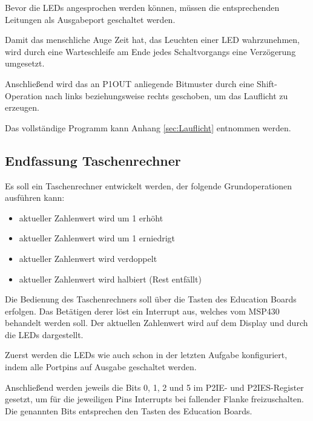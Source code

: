 \documentclass[12pt,a4paper,bibliography=totocnumbered,listof=totocnumbered]{scrartcl}
\begin{document}
Bevor die LEDs angesprochen werden können, müssen die entsprechenden Leitungen als Ausgabeport geschaltet werden.

\vspace{1em}


Damit das menschliche Auge Zeit hat, das Leuchten einer LED wahrzunehmen, wird durch eine Warteschleife am Ende jedes Schaltvorgangs eine Verzögerung umgesetzt.

\vspace{1em}


Anschließend wird das an P1OUT anliegende Bitmuster durch eine Shift-Operation nach links beziehungsweise rechts geschoben, um das Lauflicht zu erzeugen.

\vspace{1em}


Das vollständige Programm kann Anhang \ref{sec:Lauflicht} entnommen werden.

\pagebreak

\subsection{Endfassung Taschenrechner}
\label{Taschenrechner}
Es soll ein Taschenrechner entwickelt werden, der folgende Grundoperationen ausführen kann:
\begin{itemize}
	\item aktueller Zahlenwert wird um 1 erhöht
	\item aktueller Zahlenwert wird um 1 erniedrigt
	\item aktueller Zahlenwert wird verdoppelt
	\item aktueller Zahlenwert wird halbiert (Rest entfällt)
\end{itemize}
Die Bedienung des Taschenrechners soll über die Tasten des Education Boards erfolgen. Das Betätigen derer löst ein Interrupt aus, welches vom MSP430 behandelt werden soll. Der aktuellen Zahlenwert wird auf dem Display und durch die LEDs dargestellt.

Zuerst werden die LEDs wie auch schon in der letzten Aufgabe konfiguriert, indem alle Portpins auf Ausgabe geschaltet werden.

Anschließend werden jeweils die Bits 0, 1, 2 und 5 im P2IE- und P2IES-Register gesetzt, um für die jeweiligen Pins Interrupts bei fallender Flanke freizuschalten. Die genannten Bits entsprechen den Tasten des Education Boards.
\end{document}
